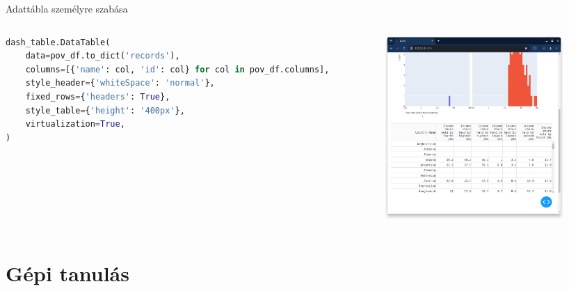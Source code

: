 \documentclass[english, aspectratio=169]{beamer}
\makeatletter
\let\origtableofcontents=\tableofcontents
\def\tableofcontents{\@ifnextchar[{\origtableofcontents}{\gobbletableofcontents}}
\def\gobbletableofcontents#1{\origtableofcontents}
\makeatother
\begin{document}
	\begin{frame}[fragile]{Adattábla személyre szabása}
		\begin{columns}
			\begin{column}{.5\textwidth}
				\begin{lstlisting}[language=python]
dash_table.DataTable(
	data=pov_df.to_dict('records'),
	columns=[{'name': col, 'id': col} for col in pov_df.columns],
	style_header={'whiteSpace': 'normal'},
	fixed_rows={'headers': True},
	style_table={'height': '400px'},
	virtualization=True,   
)
				\end{lstlisting}
			\end{column}
			\begin{column}{.5\textwidth}
				\begin{center}
					\includegraphics[width=7cm, height=7cm, keepaspectratio]{images/freq_13.png}
				\end{center}
			\end{column}
		\end{columns}
	\end{frame}
	
	\section{Gépi tanulás}
	
	\begin{frame}{}
		\tableofcontents[currentsection]
	\end{frame}
	
\end{document}
